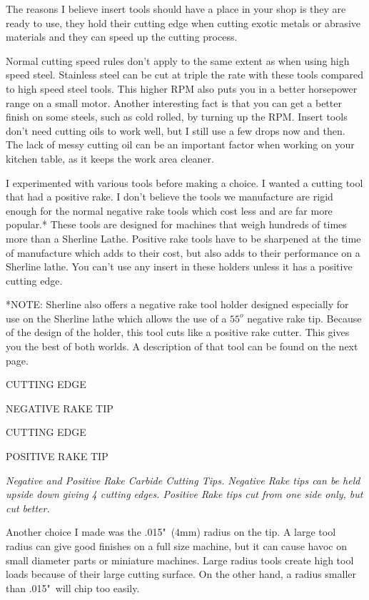 The reasons I believe insert tools should have a place in your shop is they are
ready to use, they hold their cutting edge when cutting exotic metals or
abrasive materials and they can speed up the cutting process.


Normal cutting speed rules don't apply to the same extent as when using high
speed steel. Stainless steel can be cut at triple the rate with these tools
compared to high speed steel tools. This higher RPM also puts you in a better
horsepower range on a small motor. Another interesting fact is that you can get
a better finish on some steels, such as cold rolled, by turning up the RPM.
Insert tools don't need cutting oils to work well, but I still use a few drops
now and then. The lack of messy cutting oil can be an important factor when
working on your kitchen table, as it keeps the work area cleaner.


I experimented with various tools before making a choice. I wanted a cutting
tool that had a positive rake. I don't believe the tools we manufacture are
rigid enough for the normal negative rake tools which cost less and are far more
popular.* These tools are designed for machines that weigh hundreds of times
more than a Sherline Lathe. Positive rake tools have to be sharpened at the time
of manufacture which adds to their cost, but also adds to their performance on a
Sherline lathe. You can't use any insert in these holders unless it has a
positive cutting edge.

\bigskip
*NOTE: Sherline also offers a negative rake tool holder designed especially for
use on the Sherline lathe which allows the use of a $55^{o}$ negative rake tip.
Because of the design of the holder, this tool cuts like a positive rake cutter.
This gives you the best of both worlds. A description of that tool can be found
on the next page.

\bigskip
CUTTING EDGE

NEGATIVE RAKE TIP

CUTTING EDGE

POSITIVE RAKE TIP
\bigskip

\textit{Negative and Positive Rake Carbide Cutting Tips. Negative Rake tips can
be held upside down giving 4 cutting edges. Positive Rake tips cut from one side
only, but cut better.}
\bigskip

Another choice I made was the .015"\ (4mm) radius on the tip. A large tool radius
can give good finishes on a full size machine, but it can cause havoc on small
diameter parts or miniature machines. Large radius tools create high tool loads
because of their large cutting surface. On the other hand, a radius smaller than
.015"\ will chip too easily.

